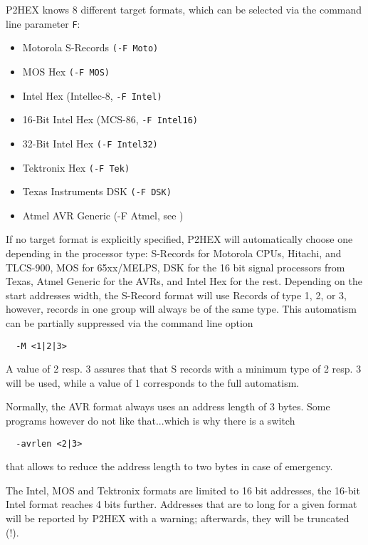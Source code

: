 \documentclass[12pt,twoside]{report}
\newcommand{\tty}[1]{{\tt #1}}
\begin{document}
P2HEX knows 8 different target formats, which can be selected via the
command line parameter \tty{F}:
\begin{itemize}
\item{Motorola S-Records \tty{(-F Moto)}}
\item{MOS Hex \tty{(-F MOS)}}
\item{Intel Hex (Intellec-8, \tty{-F Intel)}}
\item{16-Bit Intel Hex (MCS-86, \tty{-F Intel16)}}
\item{32-Bit Intel Hex \tty{(-F Intel32)}}
\item{Tektronix Hex \tty{(-F Tek)}}
\item{Texas Instruments DSK \tty{(-F DSK)}}
\item{Atmel AVR Generic (-F Atmel, see \cite{AVRObj})}
\end{itemize}
If no target format is explicitly specified, P2HEX will automatically
choose one depending in the processor type:  S-Records for Motorola
CPUs, Hitachi, and TLCS-900, MOS for 65xx/MELPS, DSK for the 16 bit
signal processors from Texas, Atmel Generic for the AVRs, and Intel Hex
for the rest.  Depending on the start addresses width, the S-Record
format will use Records of type 1, 2, or 3, however, records in one
group will always be of the same type.  This automatism can be partially
suppressed via the command line option
\begin{verbatim}
  -M <1|2|3>
\end{verbatim}
A value of 2 resp. 3 assures that that S records with a minimum type of 2
resp. 3 will be used, while a value of 1 corresponds to the full
automatism.

Normally, the AVR format always uses an address length of 3 bytes.  Some
programs however do not like that...which is why there is a switch
\begin{verbatim}
  -avrlen <2|3>
\end{verbatim}
that allows to reduce the address length to two bytes in case of
emergency.

The Intel, MOS and Tektronix formats are limited to 16 bit addresses, the
16-bit Intel format reaches 4 bits further.  Addresses that are to long
for a given format will be reported by P2HEX with a warning; afterwards,
they will be truncated (!).
\end{document}
